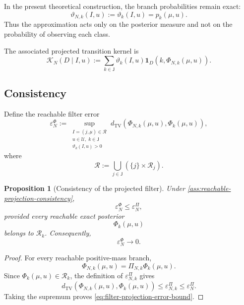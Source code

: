 \documentclass[10pt,twocolumn]{article}
\newtheorem{proposition}{Proposition}
\theoremstyle{remark}
\newcommand{\Ucal}{\mathcal{U}}
\newcommand{\one}{\mathbf{1}}
\begin{document}
In the present theoretical construction, the branch probabilities remain exact:
\begin{equation}
	\vartheta_{N,k}(I,u)
	:=
	\vartheta_k(I,u)
	=
	p_k(\mu,u).
	\label{eq:exact-branch-probabilities}
\end{equation}
Thus the approximation acts only on the posterior measure and not on the probability of observing each class.

The associated projected transition kernel is
\begin{equation}
	\mathcal K_N(D\mid I,u)
	:=
	\sum_{k\in\mathsf J}
	\vartheta_k(I,u)
	\one_D\!\left(
	k,\Phi_{N,k}(\mu,u)
	\right).
	\label{eq:approximate-information-kernel}
\end{equation}

\subsection{Consistency}
\label{subsec:approximation-consistency}

Define the reachable filter error
\begin{equation}
	\varepsilon_N^{\Phi}
	:=
	\sup_{\substack{
			I=(j,\mu)\in\mathcal R\\
			u\in\Ucal,\;k\in\mathsf J\\
			\vartheta_k(I,u)>0
	}}
	d_{\mathrm{TV}}
	\left(
	\Phi_{N,k}(\mu,u),
	\Phi_k(\mu,u)
	\right),
	\label{eq:reachable-filter-error}
\end{equation}
where
\[
\mathcal R
:=
\bigcup_{j\in\mathsf J}
\left(
\{j\}\times\mathcal R_j
\right).
\]

\begin{proposition}[Consistency of the projected filter]
	\label{prop:projected-filter-consistency}
	Under \cref{ass:reachable-projection-consistency},
	\begin{equation}
		\varepsilon_N^{\Phi}
		\leq
		\varepsilon_N^{\Pi},
		\label{eq:filter-projection-error-bound}
	\end{equation}
	provided every reachable exact posterior
	\[
	\Phi_k(\mu,u)
	\]
	belongs to \(\mathcal R_k\). Consequently,
	\begin{equation*}
		\varepsilon_N^{\Phi}\longrightarrow0.
		\label{eq:filter-consistency-limit}
	\end{equation*}
\end{proposition}

\begin{proof}
	For every reachable positive-mass branch,
	\[
	\Phi_{N,k}(\mu,u)
	=
	\Pi_{N,k}\Phi_k(\mu,u).
	\]
	Since \(\Phi_k(\mu,u)\in\mathcal R_k\), the definition of
	\(\varepsilon_{N,k}^{\Pi}\) gives
	\[
	d_{\mathrm{TV}}
	\left(
	\Phi_{N,k}(\mu,u),
	\Phi_k(\mu,u)
	\right)
	\leq
	\varepsilon_{N,k}^{\Pi}
	\leq
	\varepsilon_N^{\Pi}.
	\]
	Taking the supremum proves \cref{eq:filter-projection-error-bound}.
\end{proof}
\end{document}
